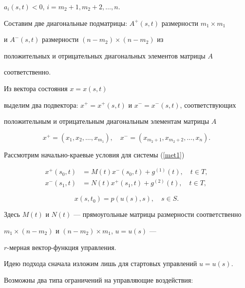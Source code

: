 $a_i(s,t)<0$, $i=m_2+1,m_2+2,\dotsc, n$. 


Составим две диагональные подматрицы: $A^+(s,t)$ размерности $m_1\times m_1$ 


и $A^-(s,t)$ размерности $(n-m_2)\times (n-m_2)$ из


положительных и отрицательных диагональных элементов матрицы $A$ 


соответственно.


Из вектора состояния $x=x(s,t)$


выделим два подвектора: $x^+=x^+(s,t)$ и $x^-=x^-(s,t)$, соответствующих


положительным и отрицательным диагональным элементам матрицы $A$


$$


x^+=(x_1,x_2,\dotsc,x_{m_1}),\quad x^-=(x_{m_2+1},x_{m_2+2},\dotsc, x_n).


$$


Рассмотрим начально-краевые условия для системы (\ref{met1})


\begin{equation}


\begin{split}


x^+(s_0,t)&=M(t) x^-(s_0,t)+g^{(1)}(t), \quad t\in T,\\


x^-(s_1,t)&=N(t) x^+(s_1,t)+g^{(2)}(t), \quad t\in T,


\end{split}


\label{met2}


\end{equation}


\begin{equation}


x(s,t_0)=p(u(s),s), \quad s\in S.


\label{met3}


\end{equation}


Здесь $M(t)$ и $N(t)$ --- прямоугольные матрицы размерности соответственно


$m_1\times (n-m_2)$ и $(n-m_2)\times m_1$, $u=u(s)$ ---


$r$-мерная вектор-функция управления.





Идею подхода сначала изложим лишь для стартовых управлений $u=u(s)$. 


Возможны два типа ограничений на управляющие воздействия:





